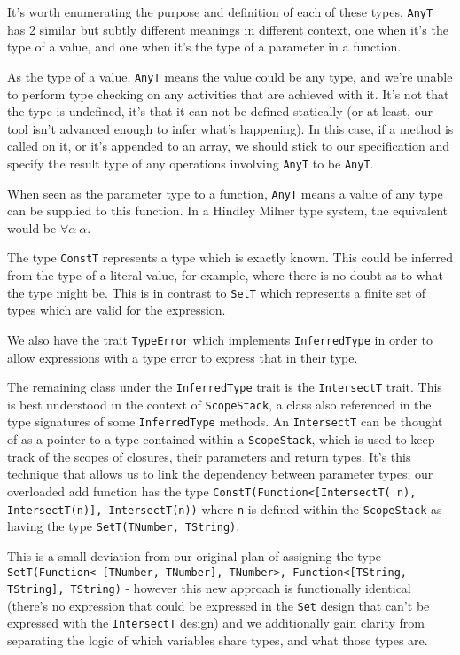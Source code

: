 \documentclass[british, twoside]{bhamthesis}
\theoremstyle{definition}
\begin{document}
      It's worth enumerating the purpose and definition of each of these types. \texttt{AnyT} has 2 similar but subtly different meanings in different context, one when it's the type of a value, and one when it's the type of a parameter in a function.

      As the type of a value, \texttt{AnyT} means the value could be any type, and we're unable to perform type checking on any activities that are achieved with it. It's not that the type is undefined, it's that it can not be defined statically (or at least, our tool isn't advanced enough to infer what's happening). In this case, if a method is called on it, or it's appended to an array, we should stick to our specification and specify the result type of any operations involving \texttt{AnyT} to be \texttt{AnyT}.

      When seen as the parameter type to a function, \texttt{AnyT} means a value of any type can be supplied to this function. In a Hindley Milner type system, the equivalent would be $\forall\alpha~\alpha$.

      The type \texttt{ConstT} represents a type which is exactly known. This could be inferred from the type of a literal value, for example, where there is no doubt as to what the type might be. This is in contrast to \texttt{SetT} which represents a finite set of types which are valid for the expression.

      We also have the trait \texttt{TypeError} which implements \texttt{InferredType} in order to allow expressions with a type error to express that in their type.

      The remaining class under the \texttt{InferredType} trait is the \texttt{IntersectT} trait. This is best understood in the context of \texttt{ScopeStack}, a class also referenced in the type signatures of some \texttt{InferredType} methods. An \texttt{IntersectT} can be thought of as a pointer to a type contained within a \texttt{ScopeStack}, which is used to keep track of the scopes of closures, their parameters and return types. It's this technique that allows us to link the dependency between parameter types; our overloaded add function has the type \texttt{ConstT(Function<[IntersectT( n), IntersectT(n)], IntersectT(n))} where \texttt{n} is defined within the \texttt{ScopeStack} as having the type \texttt{SetT(TNumber, TString)}.

      This is a small deviation from our original plan of assigning the type \texttt{SetT(Function< [TNumber, TNumber], TNumber>, Function<[TString, TString], TString)} - however this new approach is functionally identical (there's no expression that could be expressed in the \texttt{Set} design that can't be expressed with the \texttt{IntersectT} design) and we additionally gain clarity from separating the logic of which variables share types, and what those types are.
\end{document}
